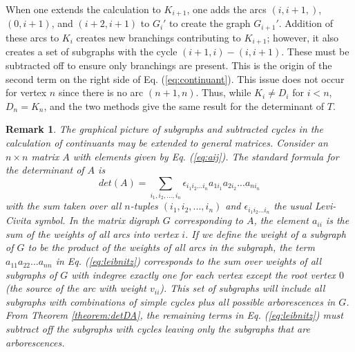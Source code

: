 \documentclass{article}
\newtheorem{remark}{Remark}
\begin{document}
When one extends the calculation to $K_{i+1}$, one adds the arcs $(i,i+1,)$, $(0, i+1)$, and $(i+2, i+1)$ to $G_i'$ to create the graph $G_{i+1}'$.  Addition of these arcs to $K_i$ creates new branchings contributing to $K_{i+1}$; however, it also creates a set of subgraphs with the cycle $(i+1,i)-(i, i+1)$.  These must be subtracted off to ensure only branchings are present.  This is the origin of the second term on the right side of Eq. (\ref{eq:continuant}).  This issue does not occur for vertex $n$ since there is no arc $(n+1, n)$.  Thus, while $K_i \ne D_i$ for $i < n$, $D_n = K_n$, and the two methods give the same result for the determinant of $T$.

\begin{remark}
    The graphical picture of subgraphs and subtracted cycles in the calculation of continuants may be extended to general matrices.  Consider an $n\times n$ matrix $A$ with elements given by Eq. (\ref{eq:aij}).  The standard formula for the determinant of $A$ is
    \begin{equation}
        det(A) = \sum_{i_1, i_2, ..., i_n} \epsilon_{i_1i_2...i_n} a_{1i_1} a_{2i_2}...a_{ni_n}
        \label{eq:leibnitz}
    \end{equation}
    with the sum taken over all $n$-tuples $(i_1, i_2, ..., i_n)$ and $\epsilon_{i_1i_2...i_n}$ the usual Levi-Civita symbol.  In the matrix digraph $G$ corresponding to $A$, the element $a_{ii}$ is the sum of the weights of all arcs into vertex $i$.  If we define the weight of a subgraph of $G$ to be the product of the weights of all arcs in the subgraph, the term $a_{11} a_{22} ... a_{nn}$ in Eq. (\ref{eq:leibnitz}) corresponds to the sum over weights of all subgraphs of $G$ with indegree exactly one for each vertex except the root vertex $0$ (the source of the arc with weight $v_{ii}$).  This set of subgraphs will include all subgraphs with combinations of simple cycles plus all possible arborescences in $G$.  From Theorem \ref{theorem:detDA},  the remaining terms in Eq. (\ref{eq:leibnitz}) must subtract off the subgraphs with cycles leaving only the subgraphs that are arborescences.
\end{remark}
\end{document}
